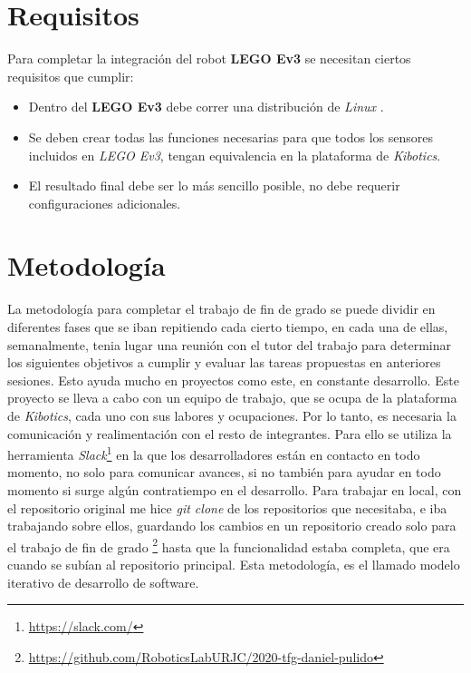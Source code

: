 \section{Requisitos}
\label{sec:requisitos}
Para completar la integración del robot \textbf{LEGO Ev3} se necesitan ciertos requisitos que cumplir:
\begin{itemize}
    \item Dentro del \textbf{LEGO Ev3} debe correr una distribución de \textit{Linux} .
\item Se deben crear todas las funciones necesarias para que todos los sensores incluidos en \textit{LEGO Ev3}, tengan equivalencia en la plataforma de \textit{Kibotics}.
    \item El resultado final debe ser lo más sencillo posible, no debe requerir configuraciones adicionales. 
\end{itemize}    

\section{Metodología}
\label{sec:metodologia}

La metodología para completar el trabajo de fin de grado se puede dividir en diferentes fases que se iban repitiendo cada cierto tiempo, en cada una de ellas, semanalmente, tenia lugar una reunión con el tutor del trabajo para determinar los siguientes objetivos a cumplir y evaluar las tareas propuestas en anteriores sesiones. Esto ayuda mucho en proyectos como este, en constante desarrollo.\newline
Este proyecto se lleva a cabo con un equipo de trabajo, que se ocupa de la plataforma de \textit{Kibotics}, cada uno con sus labores y ocupaciones. Por lo tanto, es necesaria la comunicación y realimentación con el resto de integrantes. Para ello se utiliza la herramienta \textit{Slack}\footnote{\url{https://slack.com/}} en la que los desarrolladores están en contacto en todo momento, no solo para comunicar avances, si no también para ayudar en todo momento si surge algún contratiempo en el desarrollo.\newline
Para trabajar en local, con el repositorio original me hice \textit{git clone} de los repositorios que necesitaba, e iba trabajando sobre ellos, guardando los cambios en un repositorio creado solo para el trabajo de fin de grado \footnote{\url{https://github.com/RoboticsLabURJC/2020-tfg-daniel-pulido}} hasta que la funcionalidad estaba completa, que era cuando se subían al repositorio principal. Esta metodología, es el llamado modelo iterativo de desarrollo de software.



